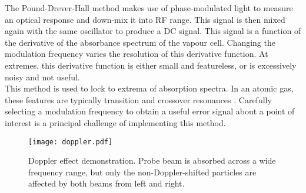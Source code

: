 The Pound-Drever-Hall method makes use of phase-modulated light to measure an
optical response and down-mix it into RF range.  This signal is then mixed again with the same oscillator to produce a DC signal.  This signal is a function of the derivative of the absorbance spectrum of the vapour cell.  Changing the modulation frequency varies the resolution of this derivative function.  At extremes, this derivative function is either small and featureless, or is excessively noisy and not useful. \\

This method is used to lock to extrema of absorption spectra.  In an atomic gas, these features are typically transition and crossover resonances \cite{maguire2006}. Carefully selecting a modulation frequency to obtain a useful error signal about a point of interest is a principal challenge of implementing this method.

\begin{figure}
    \centering
    \texttt{[image: doppler.pdf]}
    \caption{Doppler effect demonstration.  Probe beam is absorbed across a wide frequency range, but only the non-Doppler-shifted particles are affected by both beams from left and right.}
    \label{fig:doppler}
\end{figure}

